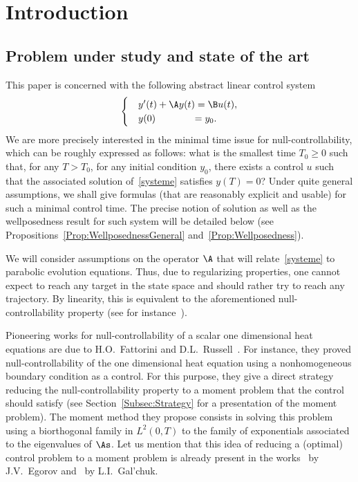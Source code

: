 \section{Introduction}

\subsection{Problem under study and state of the art}


This paper is concerned with the following abstract linear control system
\begin{equation}\label{systeme}
\begin{cases}
&y'(t) + \A y(t) = \B u(t),
\\
&y(0) \mkern68mu= y_0.
\end{cases}
\end{equation}
We are more precisely interested in the minimal time issue for null-controllability, which can be roughly expressed as follows: what is the smallest time $T_0 \geq0$ such that, for any $T > T_0$, for any initial condition $y_0$, there exists a control $u$ such that the associated solution of~\eqref{systeme} satisfies $y(T)=0$? Under quite general assumptions, we shall give formulas (that are reasonably explicit and usable) for such a minimal control time. The precise notion of solution as well as the wellposedness result for such system will be detailed below (see Propositions~\ref{Prop:WellposednessGeneral} and~\ref{Prop:Wellposedness}).

We will consider assumptions on the operator $\A$ that will relate~\eqref{systeme} to parabolic evolution equations. Thus, due to regularizing properties, one cannot expect to reach any target in the state space and should rather try to reach any trajectory. By linearity, this is equivalent to the aforementioned null-controllability property (see for instance~\cite[Sections.~2.3 and~2.5]{CoronBook}).

Pioneering works for null-controllability of a scalar one dimensional heat equations are due to H.O.~Fattorini and D.L.~Russell~\cite{FattoriniRussell71, FattoriniRussell74}. For instance, they proved null-controllability of the one dimensional heat equation using a nonhomogeneous boundary condition as a control. For this purpose, they give a direct strategy reducing the null-controllability property to a moment problem that the control should satisfy (see Section~\ref{Subsec:Strategy} for a presentation of the moment problem). The moment method they propose consists in solving this problem using a biorthogonal family in $L^2(0,T)$ to the family of exponentials associated to the eigenvalues of $\As$. Let us mention that this idea of reducing a (optimal) control problem to a moment problem is already present in the works~\cite{Egorov63} by J.V.~Egorov and~\cite{Galchuk69} by L.I.~Gal'chuk.

